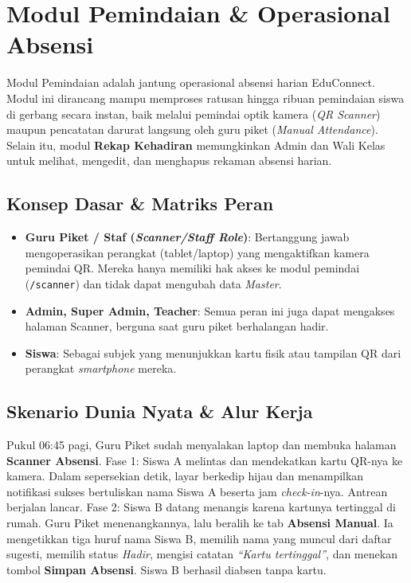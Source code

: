 \chapter{Modul Pemindaian \& Operasional Absensi}

Modul Pemindaian adalah jantung operasional absensi harian EduConnect. Modul ini dirancang mampu memproses ratusan hingga ribuan pemindaian siswa di gerbang secara instan, baik melalui pemindai optik kamera (\textit{QR Scanner}) maupun pencatatan darurat langsung oleh guru piket (\textit{Manual Attendance}). Selain itu, modul \textbf{Rekap Kehadiran} memungkinkan Admin dan Wali Kelas untuk melihat, mengedit, dan menghapus rekaman absensi harian.

\section{Konsep Dasar \& Matriks Peran}
\begin{itemize}
    \item \textbf{Guru Piket / Staf (\textit{Scanner/Staff Role})}: Bertanggung jawab mengoperasikan perangkat (tablet/laptop) yang mengaktifkan kamera pemindai QR. Mereka hanya memiliki hak akses ke modul pemindai (\texttt{/scanner}) dan tidak dapat mengubah data \textit{Master}.
    \item \textbf{Admin, Super Admin, Teacher}: Semua peran ini juga dapat mengakses halaman Scanner, berguna saat guru piket berhalangan hadir.
    \item \textbf{Siswa}: Sebagai subjek yang menunjukkan kartu fisik atau tampilan QR dari perangkat \textit{smartphone} mereka.
\end{itemize}

\section{Skenario Dunia Nyata \& Alur Kerja}

Pukul 06:45 pagi, Guru Piket sudah menyalakan laptop dan membuka halaman \textbf{Scanner Absensi}. Fase 1: Siswa A melintas dan mendekatkan kartu QR-nya ke kamera. Dalam sepersekian detik, layar berkedip hijau dan menampilkan notifikasi sukses bertuliskan nama Siswa A beserta jam \textit{check-in}-nya. Antrean berjalan lancar. Fase 2: Siswa B datang menangis karena kartunya tertinggal di rumah. Guru Piket menenangkannya, lalu beralih ke tab \textbf{Absensi Manual}. Ia mengetikkan tiga huruf nama Siswa B, memilih nama yang muncul dari daftar sugesti, memilih status \textit{Hadir}, mengisi catatan \textit{``Kartu tertinggal''}, dan menekan tombol \textbf{Simpan Absensi}. Siswa B berhasil diabsen tanpa kartu.

